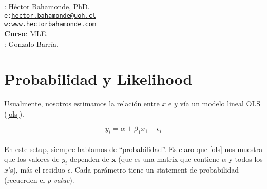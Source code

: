 \documentclass[10pt]{article}
\begin{document}


\thispagestyle{fancy} %





\hspace{-5mm}{\bf Profesor}: H\'ector Bahamonde, PhD.\\
\texttt{e:}\href{mailto:hector.bahamonde@uoh.cl}{\texttt{hector.bahamonde@uoh.cl}}\\
\texttt{w:}\href{http://www.hectorbahamonde.com}{\texttt{www.hectorbahamonde.com}}\\
{\bf Curso}: MLE.\\
\hspace{-5mm}{\bf TA}: Gonzalo Barr\'ia.


\section*{Probabilidad y Likelihood}

Usualmente, nosotros estimamos la relaci\'on entre $x$ e $y$ v\'ia un modelo lineal OLS (\autoref{ols}).

\begin{equation}\label{ols}
y_{i} = \alpha + \beta_{1}x_{1} + \epsilon_{i}
\end{equation}

\paragraph{} En este setup, siempre hablamos de ``probabilidad''. Es claro que \autoref{ols} nos muestra que los valores de $y_{i}$ dependen de ${\mathbf x}$ (que es una matrix que contiene $\alpha$ y todos los $x$'s), m\'as el residuo $\epsilon$. Cada par\'ametro tiene un statement de probabilidad (recuerden el \emph{p-value}). 
\end{document}

